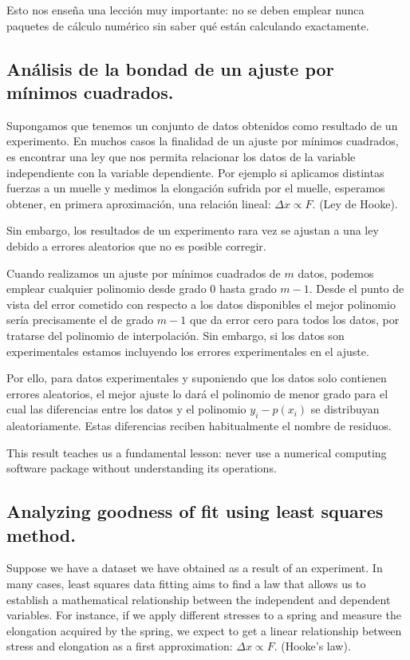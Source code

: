 \begin{paracol}{2}
Esto nos enseña una lección muy importante: no se deben emplear nunca paquetes de cálculo numérico sin saber qué están calculando exactamente. 	
\subsection{Análisis de la bondad de un ajuste por mínimos cuadrados.} 
Supongamos que tenemos un conjunto de datos obtenidos como resultado de un experimento. En muchos casos la finalidad de un ajuste por mínimos cuadrados, es encontrar una ley que nos permita relacionar los datos de la variable independiente con la variable dependiente. Por ejemplo si aplicamos distintas fuerzas a un muelle y medimos la elongación sufrida por el muelle, esperamos obtener, en primera aproximación, una relación lineal: $\Delta x\propto F$. (Ley de Hooke). 

Sin embargo, los resultados de un experimento rara vez se ajustan a una ley debido a errores aleatorios que no es posible corregir.

Cuando realizamos un ajuste por mínimos cuadrados de $m$ datos, podemos emplear cualquier polinomio desde grado $0$ hasta grado $m-1$. Desde el punto de vista del error cometido con respecto a los datos disponibles el mejor polinomio sería precisamente el de grado $m-1$ que da error cero para todos los datos, por tratarse del polinomio de interpolación. Sin embargo, si los datos son experimentales estamos incluyendo los errores experimentales en el ajuste.

Por ello, para datos experimentales y suponiendo que los datos solo contienen errores aleatorios, el mejor ajuste lo dará el polinomio de menor grado para el cual las diferencias entre los datos y el polinomio $y_i-p(x_i)$ se distribuyan aleatoriamente. Estas diferencias reciben habitualmente el nombre de residuos.  

\switchcolumn
This result teaches us a fundamental lesson: never use a numerical computing software package without understanding its operations.

\subsection{Analyzing goodness of fit using least squares method.}
Suppose we have a dataset we have obtained as a result of an experiment. In many cases, least squares data fitting aims to find a law that allows us to establish a mathematical relationship between the independent and dependent variables. For instance, if we apply different stresses to a spring and measure the elongation acquired by the spring, we expect to get a linear relationship between stress and elongation as a first approximation: $\Delta x\propto F$. (Hooke's law).


\end{paracol}
